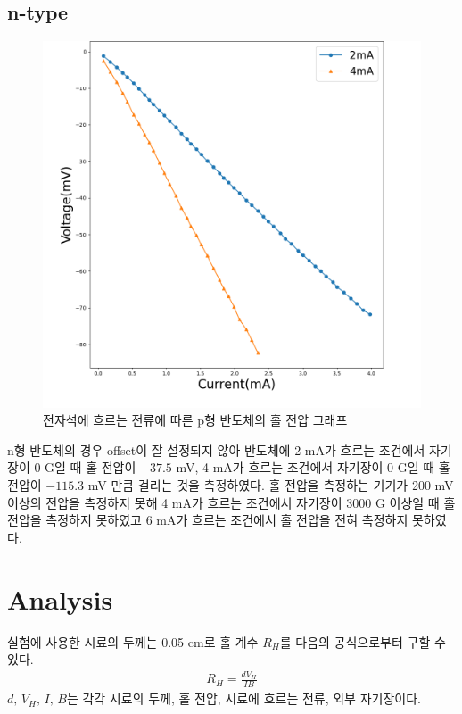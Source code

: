 \documentclass[aps,reprint,superscriptaddress,10pt]{revtex4-2}
\begin{document}
\subsection{n-type}
\begin{figure}[htbp]
  \centering
  \includegraphics[scale = 0.3]{Hall_n.png}
  \caption{전자석에 흐르는 전류에 따른 p형 반도체의 홀 전압 그래프}\label{fig:n}
\end{figure}
n형 반도체의 경우 offset이 잘 설정되지 않아 반도체에 2 mA가 흐르는 조건에서 자기장이 0 G일 때
홀 전압이 $-37.5$ mV, 4 mA가 흐르는 조건에서 자기장이 0 G일 때 홀 전압이 $-115.3$ mV 만큼 걸리는
것을 측정하였다. 홀 전압을 측정하는 기기가 200 mV 이상의 전압을 측정하지 못해 4 mA가 흐르는
조건에서 자기장이 3000 G 이상일 때 홀 전압을 측정하지 못하였고 6 mA가 흐르는 조건에서 홀 전압을
전혀 측정하지 못하였다.
\newpage
\section{Analysis}
실험에 사용한 시료의 두께는 0.05 cm로 홀 계수 $R_H$를 다음의 공식으로부터 구할 수 있다.
\begin{align}\label{eq:1-1}
  R_H = \frac{dV_H}{IB}
\end{align}
$d,\,V_H,\,I,\,B$는 각각 시료의 두께, 홀 전압, 시료에 흐르는 전류, 외부 자기장이다.
\end{document}
